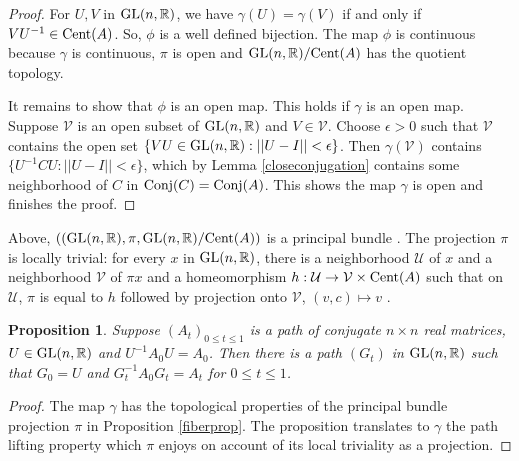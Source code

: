 \documentclass{amsart}
\newtheorem{prop}[theorem]{Proposition}
\theoremstyle{definition}
\theoremstyle{remark}
\newtheorem{remark}[theorem]{Remark}
\numberwithin{equation}{section}
\begin{document}
{{\begin{proof} 
For $U,V$ in 
$\textnormal{GL}(n,\mathbb R)$, we have 
$\gamma(U)=\gamma(V)$ if and only if $VU^{-1}\in 
\textnormal{Cent}(A)$. So, $\phi$ is a well defined bijection. 
The map $\phi$ is continuous because $\gamma$ is continuous, 
$\pi$ is open and 
$\textnormal{GL}(n,\mathbb R)/\textnormal{Cent}(A)$ has the 
quotient topology. 

It remains to show that $\phi$ is an open map. This holds if 
$\gamma$ is an open map. Suppose $\mathcal V$ is 
an open 
subset of 
$ \textnormal{GL}(n,\mathbb R)$
and  $V \in \mathcal V$. Choose $\epsilon >0$ such that 
$ \mathcal V$ contains the open set 
$\{VU \in \textnormal{GL}(n,\mathbb R): ||U-I||< \epsilon \}$. 
Then $\gamma (\mathcal V)$ contains 
$\{ U^{-1}CU: ||U-I||< \epsilon \} $, which by   
Lemma \ref{closeconjugation} contains 
some neighborhood of 
$C$ in $\textnormal{Conj}(C)
=\textnormal{Conj}(A) $.   
  This shows the map $\gamma$ 
is open and finishes the proof. 
\end{proof} 

Above, 
$((\textnormal{GL}(n,\mathbb R), \pi ,  
\textnormal{GL}(n,\mathbb R)/\textnormal{Cent}(A)) $ 
is a principal bundle
\cite[Ch. 4.2]{Hus}. 
 The projection $\pi $ is locally trivial: 
for every $x$ in 
$\textnormal{GL}(n,\mathbb R)$, there is a neighborhood  $\mathcal U$ of $x$ 
and a neighborhood $\mathcal V$ of $\pi x$ and a homeomorphism $h: 
\mathcal U \to \mathcal V \times \textnormal{Cent}(A) $ such that 
on  $\mathcal U$, $\pi $ is equal to $h$ followed by 
 projection onto $\mathcal V$, $(v,c)\mapsto v$ .

\begin{prop} \label{pathlift} 
Suppose $(A_t)_{0\leq t\leq 1}$ is a path 
of conjugate $n\times n$ real matrices, $U\in 
\textnormal{GL}(n,\mathbb R)$ and $U^{-1}A_0U=A_0$. Then there 
is a path $(G_t)$ in $\textnormal{GL}(n,\mathbb R)$ such that 
$G_0=U$ and $G_t^{-1}A_0G_t=A_t$ for $0\leq t \leq 1$. 
\end{prop} 
\begin{proof} 
The map $\gamma $ has the topological properties of 
the principal bundle projection $\pi$ in  
Proposition \ref{fiberprop}.
The proposition translates to $\gamma$ the path lifting property 
which  $\pi$ enjoys on account of its local triviality as 
a projection. 
\end{proof} 

}}
\end{document}
